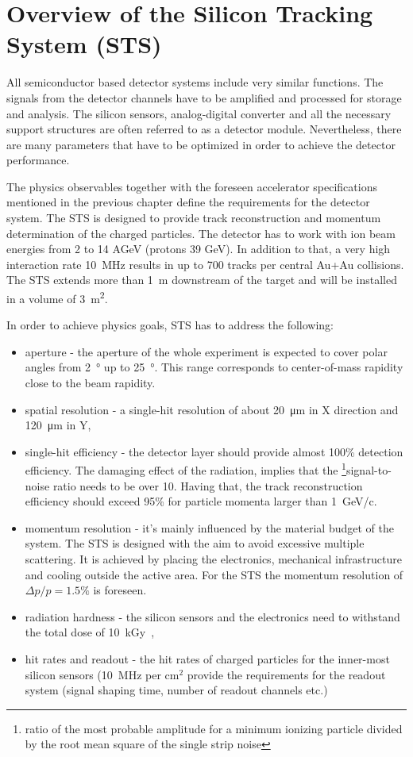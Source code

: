 
\section{Overview of the Silicon Tracking System (STS)}
All semiconductor based detector systems include very similar functions. The signals from the detector channels have to be amplified and processed for storage and analysis. The silicon sensors, analog-digital converter and all the necessary support structures are often referred to as a detector module. Nevertheless, there are many parameters that have to be optimized in order to achieve the detector performance. 

The physics observables together with the foreseen accelerator specifications mentioned in the previous chapter define the requirements for the detector system. The \gls{STS} is designed to provide track reconstruction and momentum determination of the charged particles. The detector has to work with ion beam energies from 2 to 14 AGeV (protons 39 GeV). In addition to that, a very high interaction rate 10~MHz results in up to 700 tracks per central Au+Au collisions. The \gls{STS} extends more than \SI{1}{\metre} downstream of the target and will be installed in a volume of \SI{3}{\square\metre}. 

In order to achieve physics goals, \gls{STS} has to address the following:
\begin{itemize}
    \item  aperture - the aperture of the whole experiment is expected to cover polar angles from \SI{2}{\degree} up to \SI{25}{\degree}. This range corresponds to center-of-mass rapidity close to the beam rapidity. 
    \item spatial resolution - a single-hit resolution of about \SI{20}{\micro\metre} in X direction and \SI{120}{\micro\metre} in Y, 
    \item single-hit efficiency - the detector layer should provide almost 100\% detection efficiency. The damaging effect of the radiation, implies that the \footnote{ratio of the most probable amplitude for a minimum ionizing particle divided by the root mean square of the single strip noise}{signal-to-noise} ratio needs to be over 10. Having that, the track reconstruction efficiency should exceed 95\% for particle momenta larger than 1~GeV/c. 
    \item momentum resolution - it's mainly influenced by the material budget of the system. The \gls{STS} is designed with the aim to avoid excessive multiple scattering. It is achieved by placing the electronics, mechanical infrastructure and cooling outside the active area. For the \gls{STS} the momentum resolution of $\Delta p/p = 1.5\%$ is foreseen. 
    \item radiation hardness - the silicon sensors and the electronics need to withstand the total dose of 10~kGy~\cite{Heuser:54798}, 
    \item hit rates and readout - the hit rates of charged particles for the inner-most silicon sensors (10~MHz per $\mathrm{cm^{2}}$ provide the requirements for the readout system (signal shaping time, number of readout channels etc.)
\end{itemize}

